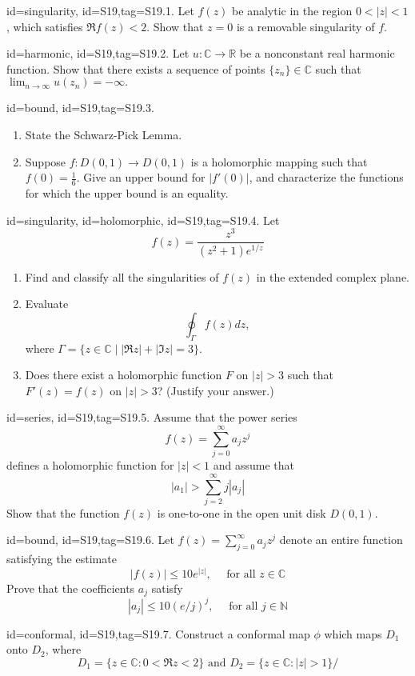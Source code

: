 \documentclass[12pt,letterpaper]{article}
\theoremstyle{plain}
\theoremstyle{definition}
\begin{document}
{\item[id=singularity, id=S19,tag=S19.1.]
Let $f(z)$ be analytic in the region $0 < | z | < 1$, which satisfies $\Re f(z) < 2$. Show that $z = 0$ is a removable singularity of $f$.
\item[id=harmonic, id=S19,tag=S19.2.]
Let $u : \mathbb{C} \rightarrow \mathbb{R}$ be a nonconstant real harmonic function. Show that there exists a sequence of points $\{z_n\} \in \mathbb{C}$ such that $\lim_{n\rightarrow \infty} u(z_n) = -\infty.$
\item[id=bound, id=S19,tag=S19.3.]
\begin{enumerate}[label=(\alph*)]\onlyitems
\item State the Schwarz-Pick Lemma.
\item Suppose $f : D(0,1) \rightarrow D(0,1)$ is a holomorphic mapping such that $f(0) = \frac{1}{6}.$ Give an upper bound for $| f'(0) |$, and characterize the functions for which the upper bound is an equality.
\end{enumerate}
\item[id=singularity, id=holomorphic, id=S19,tag=S19.4.]
Let
\[
	f(z) = \frac{z^3}{(z^2 + 1)e^{1/z}}
\]
\begin{enumerate}[label=(\alph*)]\onlyitems
\item Find and classify all the singularities of $f(z)$ in the extended complex plane.
\item Evaluate
\[
	\oint_{\Gamma} f(z) dz,
\]
where $\Gamma = \{z \in \mathbb{C} \mid | \Re z | + | \Im z | = 3\}$.
\item Does there exist a holomorphic function $F$ on $| z | > 3$ such that $F'(z) = f(z)$ on $| z | > 3$? (Justify your answer.)
\end{enumerate}

\item[id=series, id=S19,tag=S19.5.]
Assume that the power series
\[
	f(z) = \sum_{j=0}^{\infty} a_j z^j
\]
defines a holomorphic function for $| z | < 1$ and assume that
\[
	| a_1 | > \sum_{j=2}^{\infty} j | a_j |
\]
Show that the function $f(z)$ is one-to-one in the open unit disk $D(0,1)$.
\item[id=bound, id=S19,tag=S19.6.]
Let $f(z) = \sum_{j=0}^{\infty} a_j z^j$ denote an entire function satisfying the estimate
\[
	| f(z) | \le 10 e^{| z |}, \quad \text{ for all } z \in \mathbb{C}
\]
Prove that the coefficients $a_j$ satisfy
\[
	| a_j | \le 10(e/j)^j, \quad \text{ for all } j \in \mathbb{N}
\]
\item[id=conformal, id=S19,tag=S19.7.]
Construct a conformal map $\phi$ which maps $D_1$ onto $D_2$, where
\[
	D_1 = \{z \in \mathbb{C} \colon 0 < \Re z < 2\} \text{ and } D_2 = \{z \in \mathbb{C} \colon | z | > 1\}/
\]

}
\end{document}
